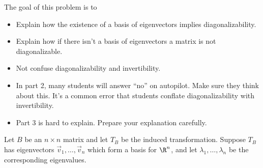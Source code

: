 	\bookonlynewpage
	\question
	\begin{annotation}
		\begin{goals}

			The goal of this problem is to
			\begin{itemize}
				\item Explain how the existence of a basis of eigenvectors implies diagonalizability.
				\item Explain how if there isn't a basis of eigenvectors a matrix is not diagonalizable.
				\item Not confuse diagonalizability and invertibility.
			\end{itemize}
		\end{goals}

		\begin{notes}
			\begin{itemize}
				\item In part 2, many students will answer ``no'' on autopilot. Make
					sure they think about this. It's a common error that students
					conflate diagonalizability with invertibility.
				\item Part 3 is hard to explain. Prepare your explanation carefully.
			\end{itemize}
		\end{notes}
	\end{annotation}
	Let $B$ be an $n\times n$ matrix and let $T_B$ be the induced transformation.
	Suppose $T_B$ has eigenvectors $\vec v_1,\ldots, \vec v_n$ which
	form a basis for $\R^n$, and let $\lambda_1,\ldots,\lambda_n$ be the corresponding
	eigenvalues.


